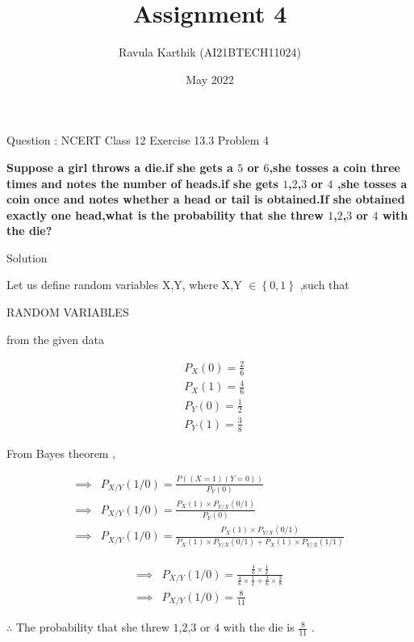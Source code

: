 \documentclass[journal,12pt,twocolumn]{beamer}
\title{Assignment 4}
\author{Ravula Karthik (AI21BTECH11024)}
\date {May 2022}
\providecommand{\cbrak}[1]{\ensuremath{\left\{#1\right\}}}
\begin{document}
	\begin{frame}
		\titlepage 
	\end{frame}
	
	\begin{frame}{Question : NCERT Class 12 Exercise 13.3 Problem 4}
		
		\textbf{Suppose a girl throws a die.if she gets a $5$ or $6$,she tosses a coin three times and notes the number of heads.if she gets $1$,$2$,$3$ or $4$ ,she tosses a coin once and notes whether a head or tail is obtained.If she obtained exactly one head,what is the probability that she threw $1$,$2$,$3$ or $4$ with the die? }
	\end{frame}
	\begin{frame}{Solution}
		
		Let us define random variables X,Y, where X,Y $\in \cbrak{0,1}$ ,such that
		
		\begin{table}[ht!]
			
			\caption{RANDOM VARIABLES}
		\end{table}
	\end{frame}
	\begin{frame}
		from the given data 
		
	\begin{align}
			&P_X(0) = \frac{2}{6} \\ 
			&P_X(1) = \frac{4}{6} \\ 
			&P_Y(0) = \frac{1}{2} \\ 
			&P_Y(1) = \frac{3}{8} 
	\end{align}  
	\end{frame}
	
	
	\begin{frame}
	   	From Bayes theorem ,
		
		\begin{align}
			\implies &P_{X/Y}(1/0) =\frac{P((X=1) (Y=0))}{P_Y(0)} \\
			\implies &P_{X/Y}(1/0) =\frac{P_X(1) \times P_{Y/X}(0/1) }{P_Y(0)} \\
			\implies &P_{X/Y}(1/0) =\frac{P_X(1) \times P_{Y/X}(0/1) }{P_X(1) \times P_{Y/X}(0/1) + P_X(1) \times P_{Y/X}(1/1) } 
		\end{align} 
		
	\end{frame}
     \begin{frame}
        	\begin{align}
        	\implies &P_{X/Y}(1/0) =\frac{\frac{4}{6} \times \frac{1}{2}}{\frac{4}{6} \times \frac{1}{2} + \frac{2}{6} \times \frac{3}{8} } \\
        	\implies &P_{X/Y}(1/0) =\frac{8}{11}
            \end{align} 
        
      $\therefore$  The probability that she threw $1$,$2$,$3$ or $4$ with the die is $\frac{8}{11}$ .
      
    \end{frame}
	
\end{document}
